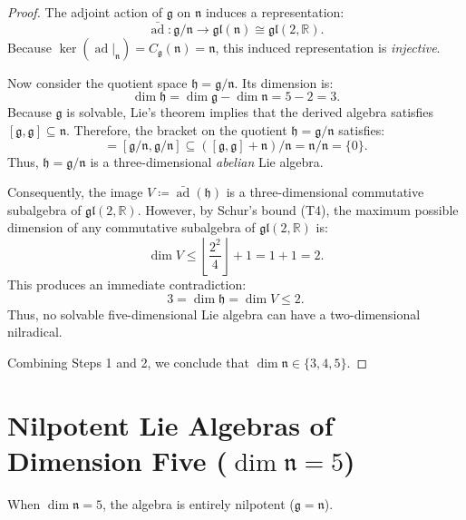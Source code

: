 \documentclass[11pt,a4paper]{article}
\theoremstyle{definition}
\theoremstyle{remark}
\newcommand{\R}{\mathbb{R}}
\newcommand{\g}{\mathfrak{g}}
\newcommand{\n}{\mathfrak{n}}
\newcommand{\ad}{\operatorname{ad}}
\begin{document}
\begin{proof}
The adjoint action of $\g$ on $\n$ induces a representation:
\begin{equation}
    \bar{\ad} \colon \g / \n \to \mathfrak{gl}(\n) \cong \mathfrak{gl}(2, \R).
\end{equation}
Because $\ker(\ad|_\n) = C_\g(\n) = \n$, this induced representation is \emph{injective}. 

Now consider the quotient space $\mathfrak{h} = \g / \n$. Its dimension is:
\begin{equation}
    \dim \mathfrak{h} = \dim \g - \dim \n = 5 - 2 = 3.
\end{equation}
Because $\g$ is solvable, Lie's theorem implies that the derived algebra satisfies $[\g, \g] \subseteq \n$. Therefore, the bracket on the quotient $\mathfrak{h} = \g / \n$ satisfies:
\begin{equation}
    [\mathfrak{h}, \mathfrak{h}] = [\g/\n, \g/\n] \subseteq ([\g, \g] + \n)/\n = \n/\n = \{0\}.
\end{equation}
Thus, $\mathfrak{h} = \g/\n$ is a three-dimensional \emph{abelian} Lie algebra.

Consequently, the image $V \coloneqq \bar{\ad}(\mathfrak{h})$ is a three-dimensional commutative subalgebra of $\mathfrak{gl}(2, \R)$. However, by Schur's bound (T4), the maximum possible dimension of any commutative subalgebra of $\mathfrak{gl}(2, \R)$ is:
\begin{equation}
    \dim V \le \left\lfloor \frac{2^2}{4} \right\rfloor + 1 = 1 + 1 = 2.
\end{equation}
This produces an immediate contradiction:
\begin{equation}
    3 = \dim \mathfrak{h} = \dim V \le 2.
\end{equation}
Thus, no solvable five-dimensional Lie algebra can have a two-dimensional nilradical.

Combining Steps 1 and 2, we conclude that $\dim \n \in \{3, 4, 5\}$.
\end{proof}

\section{Nilpotent Lie Algebras of Dimension Five ($\dim \n = 5$)}\label{sec:nilp5}

When $\dim \n = 5$, the algebra is entirely nilpotent ($\g = \n$).
\end{document}
